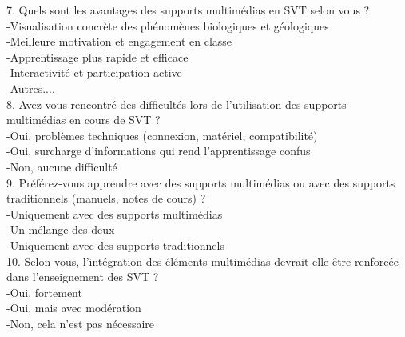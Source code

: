 \documentclass[a4paper,oneside,12pt]{book}
\begin{document}
7. Quels sont les avantages des supports multimédias en SVT selon vous ? \\
-Visualisation concrète des phénomènes biologiques et géologiques\\
-Meilleure motivation et engagement en classe\\
-Apprentissage plus rapide et efficace\\
-Interactivité et participation active\\
-Autres....\\

8. Avez-vous rencontré des difficultés lors de l’utilisation des supports multimédias en cours de SVT ?\\
-Oui, problèmes techniques (connexion, matériel, compatibilité)\\
-Oui, surcharge d’informations qui rend l’apprentissage confus\\
-Non, aucune difficulté\\


9. Préférez-vous apprendre avec des supports multimédias ou avec des supports traditionnels (manuels, notes de cours) ?\\
-Uniquement avec des supports multimédias\\
-Un mélange des deux\\
-Uniquement avec des supports traditionnels\\

10. Selon vous, l'intégration des éléments multimédias devrait-elle être renforcée dans l'enseignement des SVT ?\\
-Oui, fortement\\
-Oui, mais avec modération\\
-Non, cela n’est pas nécessaire







 
\end{document}
